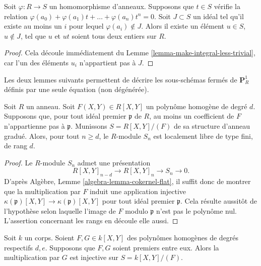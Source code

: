 \begin{lemma}
\label{lemma-make-integral-not-in-ideal}
Soit $\varphi : R \to S$ un homomorphisme d'anneaux.
Supposons que $t \in S$ v\'erifie la
relation $\varphi(a_0) + \varphi(a_1)t + \ldots + \varphi(a_n) t^n = 0$.
Soit $J \subset S$ un id\'eal tel qu'il existe
au moins un $i$ pour lequel $\varphi(a_i) \not \in J$.
Alors il existe un \'el\'ement $u \in S$, $u \not\in J$, tel
que $u$ et $ut$ soient tous deux entiers sur $R$.
\end{lemma}

\begin{proof}
Cela d\'ecoule imm\'ediatement du Lemme \ref{lemma-make-integral-less-trivial},
car l'un des \'el\'ements $u_i$ n'appartient pas \`a $J$.
\end{proof}

\noindent
Les deux lemmes suivants permettent de d\'ecrire les sous-sch\'emas ferm\'es de
$\mathbf{P}^1_R$ d\'efinis par une seule \'equation (non d\'eg\'en\'er\'ee).

\begin{lemma}
\label{lemma-P1}
Soit $R$ un anneau.
Soit $F(X, Y) \in R[X, Y]$ un polyn\^ome homog\`ene de degr\'e
$d$. Supposons que, pour tout id\'eal premier $\mathfrak p$ de $R$,
au moins un coefficient de $F$ n'appartienne pas \`a $\mathfrak p$.
Munissons $S = R[X, Y]/(F)$ de sa structure d'anneau gradu\'e.
Alors, pour tout $n \geq d$, le $R$-module $S_n$
est localement libre de type fini, de rang $d$.
\end{lemma}

\begin{proof}
Le $R$-module $S_n$ admet une pr\'esentation
$$
R[X, Y]_{n-d} \to R[X, Y]_n \to S_n \to 0.
$$
D'apr\`es Alg\`ebre, Lemme \ref{algebra-lemma-cokernel-flat},
il suffit donc de montrer que la multiplication
par $F$ induit une application injective
$\kappa(\mathfrak p)[X, Y]
\to \kappa(\mathfrak p)[X, Y]$
pour tout id\'eal premier $\mathfrak p$.
Cela r\'esulte aussit\^ot de l'hypoth\`ese selon laquelle
l'image de $F$ modulo $\mathfrak p$ n'est pas le polyn\^ome nul.
L'assertion concernant les rangs en d\'ecoule elle aussi.
\end{proof}

\begin{lemma}
\label{lemma-rel-prime-pols}
Soit $k$ un corps. Soient $F, G \in k[X, Y]$ des polyn\^omes homog\`enes
de degr\'es respectifs $d, e$. Supposons que $F, G$ soient premiers entre eux.
Alors la multiplication par $G$ est injective sur $S = k[X, Y]/(F)$.
\end{lemma}


